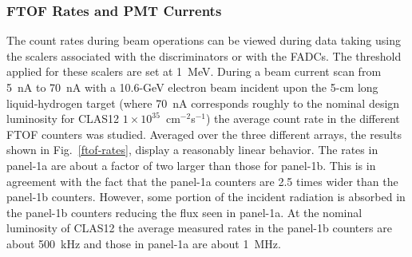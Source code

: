 \documentclass{elsart}
\begin{document}
\subsubsection{FTOF Rates and PMT Currents}

The count rates during beam operations can be viewed during data taking using the scalers associated
with the discriminators or with the FADCs. The threshold applied for these scalers are set at 1~MeV.
During a beam current scan from 5~nA to 70~nA with a 10.6-GeV electron beam incident upon the 5-cm long
liquid-hydrogen target (where 70~nA corresponds roughly to the nominal design luminosity for CLAS12
$1 \times 10^{35}$~cm$^{-2}$s$^{-1}$) the average count rate in the different FTOF counters was studied.
Averaged over the three different arrays, the results shown in Fig.~\ref{ftof-rates}, display a reasonably
linear behavior. The rates in panel-1a are about a factor of two larger than those for panel-1b. This is in
agreement with the fact that the panel-1a counters are 2.5 times wider than the panel-1b counters. However,
some portion of the incident radiation is absorbed in the panel-1b counters reducing the flux seen in panel-1a.
At the nominal luminosity of CLAS12 the average measured rates in the panel-1b counters are about 500~kHz
and those in panel-1a are about 1~MHz.
\end{document}

